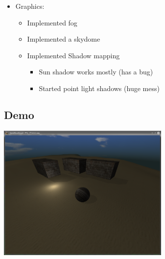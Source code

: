 \documentclass{beamer}
\begin{document}
\begin{frame}
    \begin{itemize}
    \item Graphics:
    \begin{itemize}
        \item Implemented fog
        \item Implemented a skydome
        \item Implemented Shadow mapping
        \begin{itemize}
            \item Sun shadow works mostly (has a bug)
            \item Started point light shadows (huge mess)
        \end{itemize}
    \end{itemize}
    \end{itemize}
\end{frame}
\subsection{Demo}
\begin{frame}
    \includegraphics[width=8.5cm]{images/demo}
\end{frame}
\end{document}
